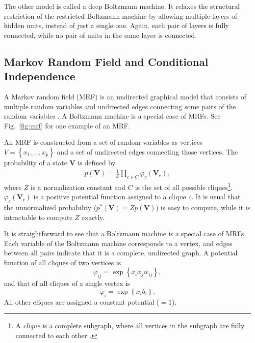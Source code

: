 \documentclass[dissertation,nocontribution,draft*]{aaltoseries}
\newcommand{\matr}[1]{\mathbf{#1}}
\newcommand{\mV}[0]{\matr{V}}
\begin{document}
The other model is called a deep Boltzmann machine. It
relaxes the structural restriction of the restricted
Boltzmann machine by allowing multiple layers of hidden
units, instead of just a single one. Again, each pair of
layers is fully connected, while no pair of units in the
same layer is connected.


\subsection{Markov Random Field and Conditional
Independence}
\label{sec:mrf}

A Markov random field (MRF) is an undirected graphical model
that consists of multiple random variables and undirected
edges connecting some pairs of the random variables
\citep[see, e.g.,][]{Kindermann1980}. A Boltzmann machine is
a special case of MRFs. See Fig.~\ref{fig:mrf} for one
example of an MRF.

An MRF is constructed from a set of random variables as
vertices $V=\left\{ x_1, \dots, x_p \right\}$ and a set of
undirected edges connecting those vertices. The probability of
a state $\mV$ is defined by 
\begin{align*}
    p(\mV) = \frac{1}{Z} \prod_{c \in C} \varphi_c
    \left(\mV_c\right),
\end{align*}
where $Z$ is a normalization constant and $C$ is the set of all
possible cliques\footnote{A \textit{clique} is a complete
subgraph, where all vertices in the subgraph are fully
connected to each other \citep[see, e.g.,][]{Bondy2008}.}.
$\varphi_c\left(\mV_c\right)$ is a positive potential
function assigned to a clique $c$. It is usual that the
unnormalized probability ($p^*(\mV) = Z p(\mV)$) is easy to
compute, while it is intractable to compute $Z$ exactly.

It is straightforward to see that a Boltzmann machine is a
special case of MRFs. Each variable of the Boltzmann machine
corresponds to a vertex, and edges between all pairs
indicate that it is a complete, undirected graph. A
potential function of all cliques of two vertices is
\[
\varphi_{ij} = \exp \left\{ x_i x_j w_{ij} \right\},
\]
and that of all cliques of a single vertex is
\[
\varphi_{i} = \exp \left\{ x_i b_i \right\}.
\]
All other cliques are assigned a constant potential ($=1$).
\end{document}
